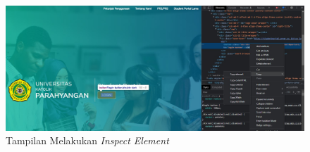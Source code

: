 \begin{figure}[H]
	\centering
	\includegraphics[scale=0.4]{Gambar/elemen.jpg}
	\caption{Tampilan Melakukan \textit{Inspect Element}} 
	\label{fig:inspect}
\end{figure}	